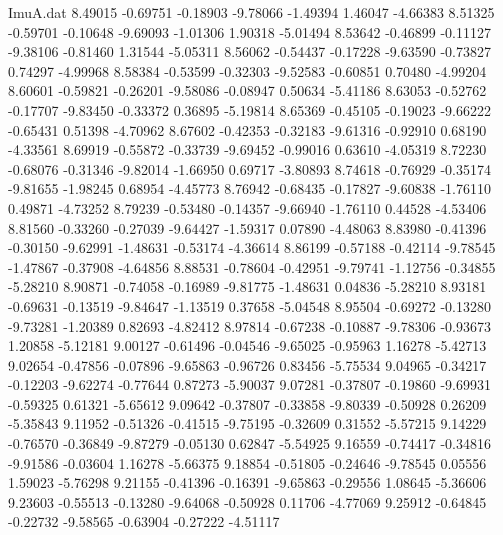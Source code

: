 \begin{filecontents}{ImuA.dat}
   8.49015   -0.69751   -0.18903   -9.78066   -1.49394    1.46047   -4.66383
   8.51325   -0.59701   -0.10648   -9.69093   -1.01306    1.90318   -5.01494
   8.53642   -0.46899   -0.11127   -9.38106   -0.81460    1.31544   -5.05311
   8.56062   -0.54437   -0.17228   -9.63590   -0.73827    0.74297   -4.99968
   8.58384   -0.53599   -0.32303   -9.52583   -0.60851    0.70480   -4.99204
   8.60601   -0.59821   -0.26201   -9.58086   -0.08947    0.50634   -5.41186
   8.63053   -0.52762   -0.17707   -9.83450   -0.33372    0.36895   -5.19814
   8.65369   -0.45105   -0.19023   -9.66222   -0.65431    0.51398   -4.70962
   8.67602   -0.42353   -0.32183   -9.61316   -0.92910    0.68190   -4.33561
   8.69919   -0.55872   -0.33739   -9.69452   -0.99016    0.63610   -4.05319
   8.72230   -0.68076   -0.31346   -9.82014   -1.66950    0.69717   -3.80893
   8.74618   -0.76929   -0.35174   -9.81655   -1.98245    0.68954   -4.45773
   8.76942   -0.68435   -0.17827   -9.60838   -1.76110    0.49871   -4.73252
   8.79239   -0.53480   -0.14357   -9.66940   -1.76110    0.44528   -4.53406
   8.81560   -0.33260   -0.27039   -9.64427   -1.59317    0.07890   -4.48063
   8.83980   -0.41396   -0.30150   -9.62991   -1.48631   -0.53174   -4.36614
   8.86199   -0.57188   -0.42114   -9.78545   -1.47867   -0.37908   -4.64856
   8.88531   -0.78604   -0.42951   -9.79741   -1.12756   -0.34855   -5.28210
   8.90871   -0.74058   -0.16989   -9.81775   -1.48631    0.04836   -5.28210
   8.93181   -0.69631   -0.13519   -9.84647   -1.13519    0.37658   -5.04548
   8.95504   -0.69272   -0.13280   -9.73281   -1.20389    0.82693   -4.82412
   8.97814   -0.67238   -0.10887   -9.78306   -0.93673    1.20858   -5.12181
   9.00127   -0.61496   -0.04546   -9.65025   -0.95963    1.16278   -5.42713
   9.02654   -0.47856   -0.07896   -9.65863   -0.96726    0.83456   -5.75534
   9.04965   -0.34217   -0.12203   -9.62274   -0.77644    0.87273   -5.90037
   9.07281   -0.37807   -0.19860   -9.69931   -0.59325    0.61321   -5.65612
   9.09642   -0.37807   -0.33858   -9.80339   -0.50928    0.26209   -5.35843
   9.11952   -0.51326   -0.41515   -9.75195   -0.32609    0.31552   -5.57215
   9.14229   -0.76570   -0.36849   -9.87279   -0.05130    0.62847   -5.54925
   9.16559   -0.74417   -0.34816   -9.91586   -0.03604    1.16278   -5.66375
   9.18854   -0.51805   -0.24646   -9.78545    0.05556    1.59023   -5.76298
   9.21155   -0.41396   -0.16391   -9.65863   -0.29556    1.08645   -5.36606
   9.23603   -0.55513   -0.13280   -9.64068   -0.50928    0.11706   -4.77069
   9.25912   -0.64845   -0.22732   -9.58565   -0.63904   -0.27222   -4.51117

\end{filecontents}
